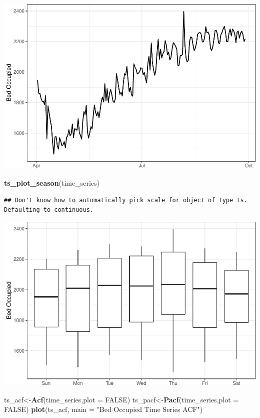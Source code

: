 \documentclass[
]{article}
\newenvironment{Shaded}{\begin{snugshade}}{\end{snugshade}}
\newcommand{\DataTypeTok}[1]{\textcolor[rgb]{0.13,0.29,0.53}{#1}}
\newcommand{\KeywordTok}[1]{\textcolor[rgb]{0.13,0.29,0.53}{\textbf{#1}}}
\newcommand{\NormalTok}[1]{#1}
\newcommand{\OtherTok}[1]{\textcolor[rgb]{0.56,0.35,0.01}{#1}}
\newcommand{\StringTok}[1]{\textcolor[rgb]{0.31,0.60,0.02}{#1}}
\begin{document}
\includegraphics{Real_files/figure-latex/plot-1.pdf}

\begin{Shaded}
\begin{Highlighting}[]
\KeywordTok{ts_plot_season}\NormalTok{(time_series)}
\end{Highlighting}
\end{Shaded}

\begin{verbatim}
## Don't know how to automatically pick scale for object of type ts. Defaulting to continuous.
\end{verbatim}

\includegraphics{Real_files/figure-latex/plot-2.pdf}

\begin{Shaded}
\begin{Highlighting}[]
\NormalTok{ts_acf<-}\KeywordTok{Acf}\NormalTok{(time_series,}\DataTypeTok{plot =} \OtherTok{FALSE}\NormalTok{)}
\NormalTok{ts_pacf<-}\KeywordTok{Pacf}\NormalTok{(time_series,}\DataTypeTok{plot =} \OtherTok{FALSE}\NormalTok{)}
\KeywordTok{plot}\NormalTok{(ts_acf, }\DataTypeTok{main =} \StringTok{"Bed Occupied Time Series ACF"}\NormalTok{)}
\end{Highlighting}
\end{Shaded}
\end{document}
